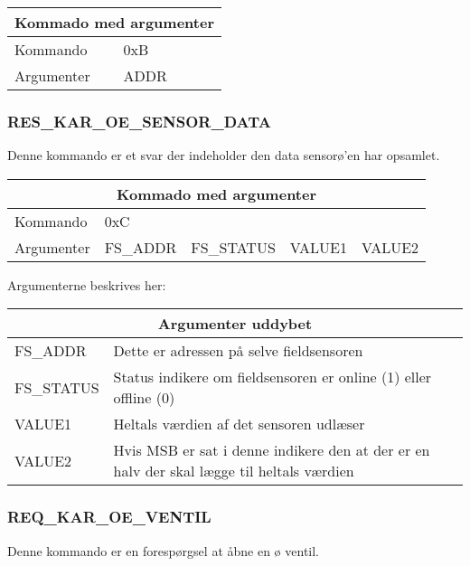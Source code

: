 \begin{table}[H]
\setlength{\parindent}{12pt}
\begin{tabular}{|l|lcc|}
\hline
\multicolumn{4}{|c|}{Kommado med argumenter}\\\hline
Kommando & 0xB & & \\
Argumenter & ADDR & & \\\hline
\end{tabular}
\end{table}


\subsubsection{RES\_KAR\_OE\_SENSOR\_DATA}
Denne kommando er et svar der indeholder den data sensorø'en har opsamlet.

\begin{table}[H]
\setlength{\parindent}{12pt}
\begin{tabular}{|l|lccc|}
\hline
\multicolumn{5}{|c|}{Kommado med argumenter}\\\hline
Kommando & 0xC & & & \\
Argumenter & FS\_ADDR & FS\_STATUS & VALUE1 & VALUE2 \\\hline
\end{tabular}
\end{table}

Argumenterne beskrives her:

\begin{table}[H]
\setlength{\parindent}{12pt}
\begin{tabular}{|l|l|}
\hline
\multicolumn{2}{|c|}{Argumenter uddybet}\\\hline
FS\_ADDR 	& Dette er adressen på selve fieldsensoren \\
FS\_STATUS	& Status indikere om fieldsensoren er online (1) eller offline (0) \\
VALUE1 		& Heltals værdien af det sensoren udlæser \\
VALUE2 		& Hvis MSB er sat i denne indikere den at der er en halv der skal lægge til heltals værdien \\\hline
\end{tabular}
\end{table}

\subsubsection{REQ\_KAR\_OE\_VENTIL}
Denne kommando er en forespørgsel at åbne en ø ventil.

